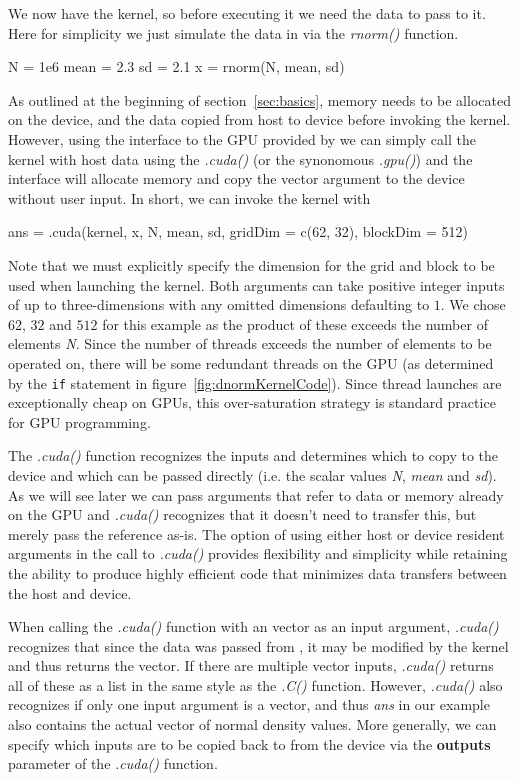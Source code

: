 \documentclass[article]{jss}
\def\R{\proglang{R}}
\def\Rpkg#1{\pkg{#1}}
\def\Rfunc#1{\textsl{#1()}}
\def\Rvar#1{\textsl{#1}}
\def\Rarg#1{\textbf{#1}}
\begin{document}
We now have the kernel, so before executing it we need the data to pass to it. Here for simplicity 
we just simulate the data in \R{} via the \Rfunc{rnorm} function.
\begin{RCode}
N = 1e6
mean = 2.3
sd =  2.1
x = rnorm(N, mean, sd)
\end{RCode}
As outlined at the beginning of section~\ref{sec:basics}, memory needs
to be allocated on the device, and the data copied from host to device 
before invoking the kernel. However, using the \R{} interface to the GPU
provided by \Rpkg{RCUDA} we can simply call the kernel with host data 
using the \Rfunc{.cuda} (or the synonomous \Rfunc{.gpu}) and the 
\R{} interface will allocate memory and copy the \R{} vector
argument to the device without user input. In short, we can invoke the 
kernel with
\begin{RCode}
ans = .cuda(kernel, x, N, mean, sd, gridDim = c(62, 32), blockDim = 512)
\end{RCode}
Note that we must explicitly specify the dimension for the grid and block to be
used when launching the kernel. Both arguments can take positive integer 
inputs of up to three-dimensions with any omitted dimensions defaulting to $1$.
We chose $62$, $32$ and $512$ for this example as the product
of these exceeds the number of elements \Rvar{N}. Since the number of
threads exceeds the number of elements to be operated on, there will be
some redundant threads on the GPU (as determined by the \texttt{if}
statement in figure~\ref{fig:dnormKernelCode}). Since thread launches
are exceptionally cheap on GPUs, this over-saturation strategy is 
standard practice for GPU programming.

The \Rfunc{.cuda} function recognizes the inputs and determines which
to copy to the device and which can be passed directly (i.e. the
scalar values \Rvar{N}, \Rvar{mean} and \Rvar{sd}). As we will see later
we can pass arguments that refer to data or memory already on the
GPU and \Rfunc{.cuda} recognizes that it doesn't need to transfer
this, but merely pass the reference as-is. The option of using 
either host or device resident arguments in the call to \Rfunc{.cuda}
provides flexibility and simplicity while retaining the ability to
produce highly efficient code that minimizes data transfers between
the host and device.


When calling the \Rfunc{.cuda} function with an \R{} vector as an input argument,
\Rfunc{.cuda} recognizes that since the data was passed from \R{}, it 
may be modified by the kernel and thus returns the vector.  If
there are multiple vector inputs, \Rfunc{.cuda} returns all of these as
a list in the same style as the \Rfunc{.C} function. However, \Rfunc{.cuda}
also recognizes if only one input argument is a vector, and thus \Rvar{ans} in
our example also contains the actual vector of normal density values.  More
generally, we can specify which inputs are to be copied back to \R{}
from the device via the \Rarg{outputs} parameter of the \Rfunc{.cuda}
function.
\end{document}
